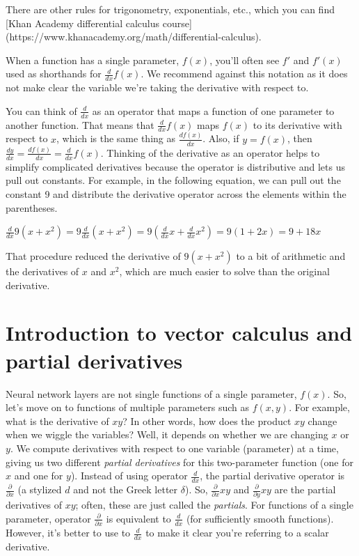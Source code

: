 \documentclass[11pt]{article}
\begin{document}
There are other rules for trigonometry, exponentials, etc., which you can find [Khan Academy differential calculus course](https://www.khanacademy.org/math/differential-calculus).

When a function has a single parameter, $f(x)$, you'll often see $f'$ and $f'(x)$ used as shorthands for $\frac{d}{dx}f(x)$. We recommend against this notation as it does not make clear the variable we're taking the derivative with respect to. 

You can think of $\frac{d}{dx}$ as an operator that maps a function of one parameter to another function.  That means that $\frac{d}{dx} f(x)$ maps $f(x)$ to its derivative with respect to $x$, which is the same thing as $\frac{df(x)}{dx}$. Also, if $y = f(x)$, then $\frac{dy}{dx} = \frac{df(x)}{dx} = \frac{d}{dx}f(x)$. Thinking of the derivative as an operator helps to simplify complicated derivatives because the operator is distributive and lets us pull out constants. For example, in the following equation, we can pull out the constant 9 and distribute the derivative operator across the elements within the parentheses.

$\frac{d}{dx} 9(x + x^2) = 9 \frac{d}{dx}(x + x^2) = 9 (\frac{d}{dx}x + \frac{d}{dx}x^2) = 9(1 + 2x) = 9 + 18x$

That procedure reduced the derivative of $9(x + x^2)$ to a bit of arithmetic and the derivatives of $x$ and $x^2$, which are much easier to solve than the original derivative.

\section{Introduction to vector calculus and partial derivatives}

Neural network layers are not single functions of a single parameter, $f(x)$. So, let's move on to functions of multiple parameters such as $f(x,y)$. For example, what is the derivative of $xy$? In other words, how does the product $xy$ change when we wiggle the variables? Well, it depends on whether we are changing $x$ or $y$.  We compute derivatives with respect to one variable (parameter) at a time, giving us two different {\em partial derivatives} for this two-parameter function (one for $x$ and one for $y$).  Instead of using operator $\frac{d}{dx}$, the partial derivative operator is  $\frac{\partial}{\partial x}$ (a stylized $d$ and not the Greek letter $\delta$). So, $\frac{\partial }{\partial x}xy$ and $\frac{\partial }{\partial y}xy$ are the partial derivatives of $xy$; often, these are just called the {\em partials}.  For functions of a single parameter, operator $\frac{\partial}{\partial x}$ is equivalent to $\frac{d}{dx}$ (for sufficiently smooth functions). However, it's better to use to $\frac{d}{dx}$ to make it clear you're referring to a scalar derivative.
\end{document}
